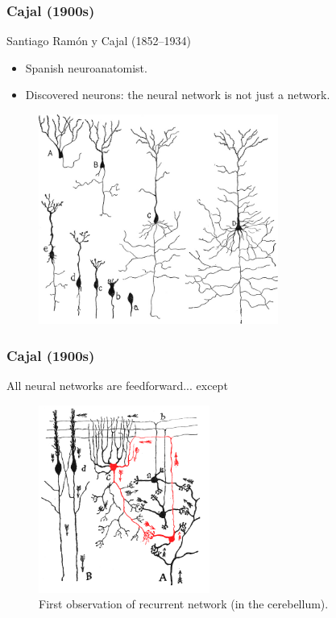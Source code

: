 \documentclass{beamer}
\begin{document}
\begin{frame}
\frametitle{Cajal (1900s)}
    Santiago Ramón y Cajal (1852--1934)
    \begin{itemize}
        \item Spanish neuroanatomist.
        \item Discovered neurons: the neural network is not just a network.
    \end{itemize}
    \begin{figure}[t]
        \includegraphics[width=0.7\textwidth]{figure/Cajal_neurons_examples.jpg}
        \centering
    \end{figure}
\end{frame}

\begin{frame}
    \frametitle{Cajal (1900s)}
    All neural networks are feedforward... \pause except
    \begin{figure}[t]
        \includegraphics[width=0.5\textwidth]{figure/Cajal_RNN.png}
        \centering
        \caption{First observation of recurrent network (in the cerebellum). \cite[figure 103, page 149]{ramonycajalHistologieSystemeNerveux1909}}
    \end{figure}
    
\end{frame}
\end{document}
